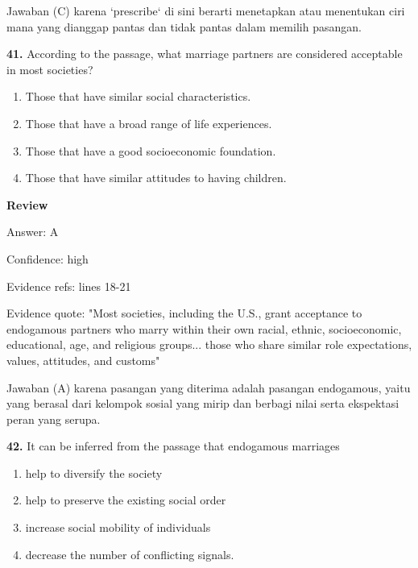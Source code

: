 \documentclass[12pt]{article}
\begin{document}
Jawaban (C) karena `prescribe` di sini berarti menetapkan atau menentukan ciri mana yang dianggap pantas dan tidak pantas dalam memilih pasangan.\par
\endgroup
\par
\vspace{0.25\baselineskip}
\noindent\textbf{41.} According to the passage, what marriage partners are considered acceptable in most societies?
\begin{enumerate}[label=(\Alph*),leftmargin=*,itemsep=0.2em]
\item Those that have similar social characteristics.
\item Those that have a broad range of life experiences.
\item Those that have a good socioeconomic foundation.
\item Those that have similar attitudes to having children.
\end{enumerate}
\par
\begingroup
\setlength{\parskip}{0pt}
\setlength{\parindent}{0pt}
\textbf{Review}\par
Answer: A\par
Confidence: high\par
Evidence refs: lines 18-21\par
Evidence quote: "Most societies, including the U.S., grant acceptance to endogamous partners who marry within their own racial, ethnic, socioeconomic, educational, age, and religious groups... those who share similar role expectations, values, attitudes, and customs"\par
Jawaban (A) karena pasangan yang diterima adalah pasangan endogamous, yaitu yang berasal dari kelompok sosial yang mirip dan berbagi nilai serta ekspektasi peran yang serupa.\par
\endgroup
\par
\vspace{0.25\baselineskip}
\noindent\textbf{42.} It can be inferred from the passage that endogamous marriages
\begin{enumerate}[label=(\Alph*),leftmargin=*,itemsep=0.2em]
\item help to diversify the society
\item help to preserve the existing social order
\item increase social mobility of individuals
\item decrease the number of conflicting signals.
\end{enumerate}
\par
\end{document}
